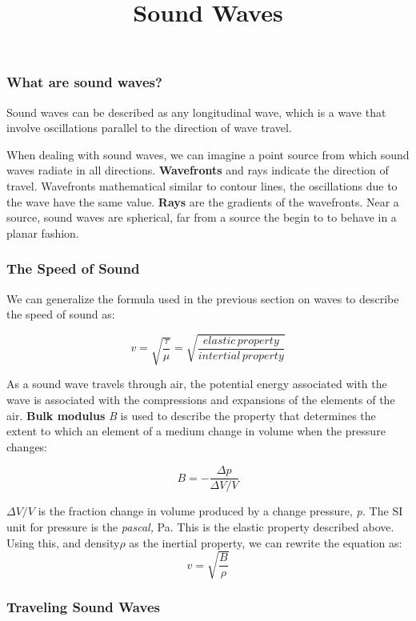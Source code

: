 \documentclass[english]{article}
\begin{document}
\title{Sound Waves}

\maketitle

\subsubsection*{What are sound waves? }

Sound waves can be described as any longitudinal wave, which is a
wave that involve oscillations parallel to the direction of wave travel.

When dealing with sound waves, we can imagine a point source from
which sound waves radiate in all directions. \textbf{Wavefronts} and
rays indicate the direction of travel. Wavefronts mathematical similar
to contour lines, the oscillations due to the wave have the same value.
\textbf{Rays} are the gradients of the wavefronts. Near a source,
sound waves are spherical, far from a source the begin to to behave
in a planar fashion.


\subsubsection*{The Speed of Sound}

We can generalize the formula used in the previous section on waves
to describe the speed of sound as:

\[
v=\sqrt{\frac{\tau}{\mu}}=\sqrt{\frac{elastic\, property}{intertial\, property}}
\]


As a sound wave travels through air, the potential energy associated
with the wave is associated with the compressions and expansions of
the elements of the air. \textbf{Bulk modulus} \emph{B }is used to
describe the property that determines the extent to which an element
of a medium change in volume when the pressure changes: 

\[
B=-\frac{\Delta p}{\Delta V/V}
\]


$\Delta V/V$ is the fraction change in volume produced by a change
pressure, \emph{p. }The SI unit for pressure is the \emph{pascal,
}Pa. This is the elastic property described above. Using this, and
density$\rho$ as the inertial property, we can rewrite the equation
as:
\[
v=\sqrt{\frac{B}{\rho}}
\]



\subsubsection*{Traveling Sound Waves}
\end{document}
